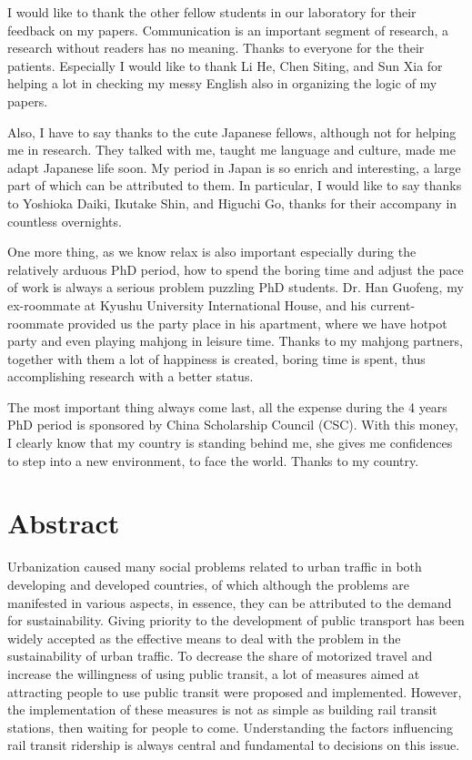 \documentclass[12pt, twoside, a4paper]{book} %
\begin{document}
I would like to thank the other fellow students in our laboratory for their feedback on my papers. Communication is an important segment of research, a research without readers has no meaning. Thanks to everyone for the their patients. Especially I would like to thank Li He, Chen Siting, and Sun Xia for helping a lot in checking my messy English also in organizing the logic of my papers. 

Also, I have to say thanks to the cute Japanese fellows, although not for helping me in research. They talked with me, taught me language and culture, made me adapt Japanese life soon. My period in Japan is so enrich and interesting, a large part of which can be attributed to them. In particular, I would like to say thanks to Yoshioka Daiki, Ikutake Shin, and Higuchi Go, thanks for their accompany in countless overnights.

One more thing, as we know relax is also important especially during the relatively arduous PhD period, how to spend the boring time and adjust the pace of work is always a serious problem puzzling PhD students. Dr. Han Guofeng, my ex-roommate at Kyushu University International House, and his current-roommate provided us the party place in his apartment, where we have hotpot party and even playing mahjong in leisure time. Thanks to my mahjong partners, together with them a lot of happiness is created, boring time is spent, thus accomplishing research with a better status.

The most important thing always come last, all the expense during the 4 years PhD period is sponsored by China Scholarship Council (CSC). With this money, I clearly know that my country is standing behind me, she gives me confidences to step into a new environment, to face the world. Thanks to my country.

\chapter{Abstract}
Urbanization caused many social problems related to urban traffic in both developing and developed countries, of which although the problems are manifested in various aspects, in essence, they can be attributed to the demand for sustainability. Giving priority to the development of public transport has been widely accepted as the effective means to deal with the problem in the sustainability of urban traffic. To decrease the share of motorized travel and increase the willingness of using public transit, a lot of measures aimed at attracting people to use public transit were proposed and implemented. However, the implementation of these measures is not as simple as building rail transit stations, then waiting for people to come. Understanding the factors influencing rail transit ridership is always central and fundamental to decisions on this issue.
\end{document}
